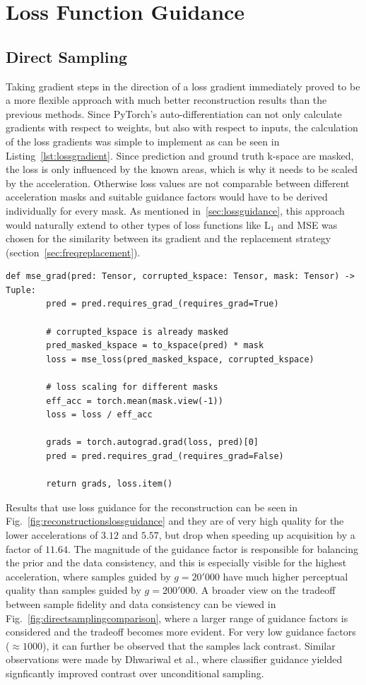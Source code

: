 \section{Loss Function Guidance}
\subsection{Direct Sampling}
Taking gradient steps in the direction of a loss gradient immediately proved to be a more flexible approach with much better reconstruction results than the previous methods. Since PyTorch's auto-differentiation can not only calculate gradients with respect to weights, but also with respect to inputs, the calculation of the loss gradients was simple to implement as can be seen in Listing~\ref{lst:lossgradient}. Since prediction and ground truth k-space are masked, the loss is only influenced by the known areas, which is why it needs to be scaled by the acceleration. Otherwise loss values are not comparable between different acceleration masks and suitable guidance factors would have to be derived individually for every mask. As mentioned in~\ref{sec:lossguidance}, this approach would naturally extend to other types of loss functions like $\text{L}_1$ and MSE was chosen for the similarity between its gradient and the replacement strategy (section~\ref{sec:freqreplacement}).
\begin{lstlisting}[language=iPython, caption=Calculation of the loss gradient., float=htbp, label=lst:lossgradient]
    def mse_grad(pred: Tensor, corrupted_kspace: Tensor, mask: Tensor) -> Tuple:
        pred = pred.requires_grad_(requires_grad=True)

        # corrupted_kspace is already masked
        pred_masked_kspace = to_kspace(pred) * mask
        loss = mse_loss(pred_masked_kspace, corrupted_kspace)

        # loss scaling for different masks
        eff_acc = torch.mean(mask.view(-1))
        loss = loss / eff_acc

        grads = torch.autograd.grad(loss, pred)[0]
        pred = pred.requires_grad_(requires_grad=False)

        return grads, loss.item()
\end{lstlisting}
Results that use loss guidance for the reconstruction can be seen in Fig.~\ref{fig:reconstructionslossguidance} and they are of very high quality for the lower accelerations of $3.12$ and $5.57$, but drop when speeding up acquisition by a factor of $11.64$. The magnitude of the guidance factor is responsible for balancing the prior and the data consistency, and this is especially visible for the highest acceleration, where samples guided by $g=20'000$ have much higher perceptual quality than samples guided by $g=200'000$. A broader view on the tradeoff between sample fidelity and data consistency can be viewed in Fig.~\ref{fig:directsamplingcomparison}, where a larger range of guidance factors is considered and the tradeoff becomes more evident. For very low guidance factors ($\approx 1000$), it can further be observed that the samples lack contrast. Similar observations were made by Dhwariwal et al., where classifier guidance yielded signficantly improved contrast over unconditional sampling.~\autocite{dhariwal2021diffusion}
